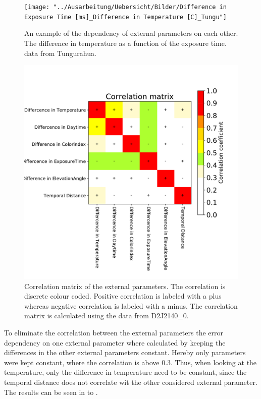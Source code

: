 \documentclass  [
  paper    = a4,
  BCOR     = 10mm,
  twoside,
  fontsize = 12pt,
  fleqn,
  toc      = bibnumbered,
  toc      = listofnumbered,
  numbers  = noendperiod,
  headings = normal,
  listof   = leveldown,
  version  = 3.03
]                                       {scrreprt}
\begin{document}
	\begin{figure}[h]
		\centering
		\texttt{[image: "../Ausarbeitung/Uebersicht/Bilder/Difference in Exposure Time [ms]\_Difference in Temperature [C]\_Tungu"]}
		\caption{An example of the dependency of external parameters on each other. The difference in temperature as a function of the exposure time. data from Tungurahua.}
		\label{fig:difference-in-exposure-time-msdifference-in-temperature-ctungu}
	\end{figure}
	\begin{figure}[h]
		\centering
		\includegraphics[width=1\linewidth]{Bilder/varCorrelation_matrix}
		\caption{Correlation matrix of the external parameters. The correlation is discrete colour coded. Positive correlation is labeled with a plus whereas negative correlation is labeled with a minus. The correlation matrix is calculated using the data from D2J2140\_0.}
		\label{fig:varcorrelationmatrix}
	\end{figure}
%
	To eliminate the correlation between the external parameters the   error dependency on one external parameter where calculated by keeping the differences in the other external parameters constant. Hereby only parameters were kept constant, where the correlation is above 0.3. Thus, when looking at the temperature, only the difference in temperature need to be constant, since the temporal distance does not correlate wit the other considered external parameter. The results can be seen in  to .\\
\end{document}
